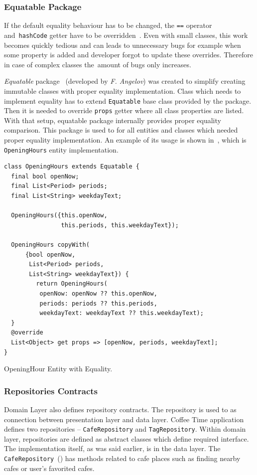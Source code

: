 \subsubsection{Equatable Package}
If the default equality behaviour has to be changed, the \verb|==| operator\\ and~\verb|hashCode| getter have to be overridden~\cite{dart-equality}.
Even with small classes, this work becomes quickly tedious and can leads to unnecessary bugs for example when some property is added and developer forgot to update these overrides. Therefore in case of complex classes the~amount of bugs only increases. 

\textit{Equatable} package~\cite{package-equatable} (developed by \textit{F. Angelov}) was created to simplify creating immutable classes with proper equality implementation. Class which needs to implement equality has to extend \verb|Equatable| base class provided by the package. Then it is needed to override \verb|props| getter where all class properties are listed. With that setup, equatable package internally provides proper equality comparison. This package is used to for all entities and classes which needed proper equality implementation. An example of its usage is shown in~, which is \verb|OpeningHours| entity implementation. 

\begin{listing}[!htb]
\begin{verbatim}
class OpeningHours extends Equatable {
  final bool openNow;
  final List<Period> periods;
  final List<String> weekdayText;

  OpeningHours({this.openNow, 
                this.periods, this.weekdayText});

  OpeningHours copyWith(
      {bool openNow, 
       List<Period> periods,
       List<String> weekdayText}) {
         return OpeningHours(
          openNow: openNow ?? this.openNow,
          periods: periods ?? this.periods,
          weekdayText: weekdayText ?? this.weekdayText);
  }
  @override
  List<Object> get props => [openNow, periods, weekdayText];
}
\end{verbatim}
\caption{OpeningHour Entity with Equality.}
\label{listing:ct-opening-hour-entity}
\end{listing}

\subsubsection{Repositories Contracts}
Domain Layer also defines repository contracts. The repository is used to as connection between presentation layer and data layer. Coffee Time application defines two repositories -- \verb|CafeRepository| and \verb|TagRepository|. Within domain layer, repositories are defined as abstract classes which define required interface. The implementation itself, as was said earlier, is in the data layer. The \verb|CafeRepository|~() has methods related to cafe places such as finding nearby cafes or user's favorited cafes. 

